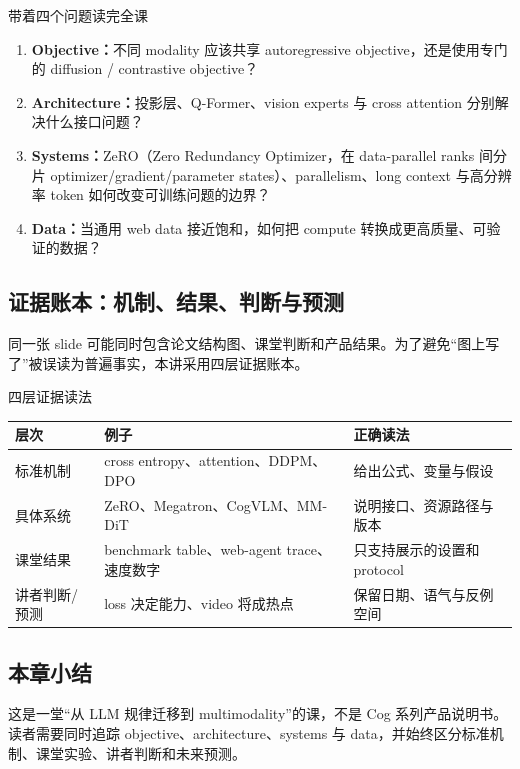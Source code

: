
\begin{importantbox}{带着四个问题读完全课}
\begin{enumerate}
  \item \textbf{Objective：}不同 modality 应该共享 autoregressive objective，还是使用专门的 diffusion / contrastive objective？
  \item \textbf{Architecture：}投影层、Q-Former、vision experts 与 cross attention 分别解决什么接口问题？
  \item \textbf{Systems：}ZeRO（Zero Redundancy Optimizer，在 data-parallel ranks 间分片 optimizer/gradient/parameter states）、parallelism、long context 与高分辨率 token 如何改变可训练问题的边界？
  \item \textbf{Data：}当通用 web data 接近饱和，如何把 compute 转换成更高质量、可验证的数据？
\end{enumerate}
\end{importantbox}


\subsection{证据账本：机制、结果、判断与预测}

同一张 slide 可能同时包含论文结构图、课堂判断和产品结果。为了避免“图上写了”被误读为普遍事实，本讲采用四层证据账本。

\begin{knowledgebox}{四层证据读法}
\begin{tabularx}{\textwidth}{L{0.18\textwidth} L{0.31\textwidth} X}
\toprule
层次 & 例子 & 正确读法 \\
\midrule
标准机制 & cross entropy、attention、DDPM、DPO & 给出公式、变量与假设 \\
具体系统 & ZeRO、Megatron、CogVLM、MM-DiT & 说明接口、资源路径与版本 \\
课堂结果 & benchmark table、web-agent trace、速度数字 & 只支持展示的设置和 protocol \\
讲者判断/预测 & loss 决定能力、video 将成热点 & 保留日期、语气与反例空间 \\
\bottomrule
\end{tabularx}
\end{knowledgebox}

\subsection{本章小结}

这是一堂“从 LLM 规律迁移到 multimodality”的课，不是 Cog 系列产品说明书。读者需要同时追踪 objective、architecture、systems 与 data，并始终区分标准机制、课堂实验、讲者判断和未来预测。

